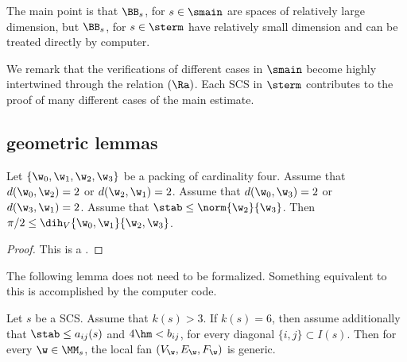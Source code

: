 The main point is that $\BB_s$, for $s\in\smain$ are spaces of relatively large
dimension, but $\BB_s$, for $s\in\sterm$ have relatively small dimension and
can be treated directly by computer.




We remark that the verifications of  different cases in $\smain$ become
highly intertwined through the relation $(\Ra)$.  Each SCS
 in $\sterm$ contributes to the proof of many different cases
of the main estimate.




\subsection{geometric lemmas}

\begin{lemma}\label{lemma:scs-obtuse}
Let $\{\w_0,\w_1,\w_2,\w_3\}$ be a packing of cardinality four.
Assume that $d(\w_0,\w_2)=2$ or $d(\w_2,\w_1)=2$.
Assume that $d(\w_0,\w_3)=2$ or $d(\w_3,\w_1)=2$.
Assume that $\stab\le \norm{\w_2}{\w_3}$.  Then
$\pi/2 \le \dih_V \{\w_0,\w_1 \} \{\w_2,\w_3 \}$.
\end{lemma}

\begin{proof} This is a .
\end{proof}

The following lemma does not need to be formalized.  Something
equivalent
to this is accomplished by the computer code.


\begin{lemma}\label{lemma:bjo} 
Let $s$ be a SCS.
Assume that $k(s)>3$.
If $k(s)=6$, then assume additionally that
$\stab\le a_{i j}(s)$ and $4\hm < b_{i j}$, 
for every diagonal $\{i,j\}\subset I(s)$.
Then for every  $\w\in\MM_s$,  the local fan $(V_\w,E_\w,F_\w)$ is generic.
\end{lemma}

